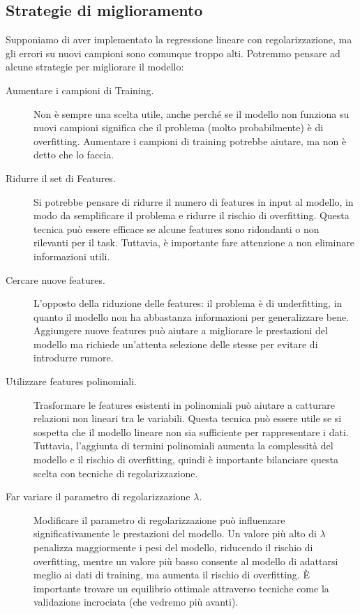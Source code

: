 \subsection{Strategie di miglioramento}
Supponiamo di aver implementato la regressione lineare con regolarizzazione, ma gli errori su nuovi campioni sono comunque troppo alti. Potremmo pensare ad alcune strategie per migliorare il modello:
\begin{description}
	\item[Aumentare i campioni di Training.] Non è sempre una scelta utile, anche perché se il modello non funziona su nuovi campioni significa che il problema (molto probabilmente) è di overfitting. Aumentare i campioni di training potrebbe aiutare, ma non è detto che lo faccia.
	\item[Ridurre il set di Features.] Si potrebbe pensare di ridurre il numero di features in input al modello, in modo da semplificare il problema e ridurre il rischio di overfitting. Questa tecnica può essere efficace se alcune features sono ridondanti o non rilevanti per il task. Tuttavia, è importante fare attenzione a non eliminare informazioni utili. 
	\item[Cercare nuove features.] L'opposto della riduzione delle features: il problema è di underfitting, in quanto il modello non ha abbastanza informazioni per generalizzare bene. Aggiungere nuove features può aiutare a migliorare le prestazioni del modello ma richiede un'attenta selezione delle stesse per evitare di introdurre rumore.
	\item[Utilizzare features polinomiali.] Trasformare le features esistenti in polinomiali può aiutare a catturare relazioni non lineari tra le variabili. Questa tecnica può essere utile se si sospetta che il modello lineare non sia sufficiente per rappresentare i dati. Tuttavia, l'aggiunta di termini polinomiali aumenta la complessità del modello e il rischio di overfitting, quindi è importante bilanciare questa scelta con tecniche di regolarizzazione.
	\item[Far variare il parametro di regolarizzazione $\lambda$.] Modificare il parametro di regolarizzazione può influenzare significativamente le prestazioni del modello. Un valore più alto di $\lambda$ penalizza maggiormente i pesi del modello, riducendo il rischio di overfitting, mentre un valore più basso consente al modello di adattarsi meglio ai dati di training, ma aumenta il rischio di overfitting. È importante trovare un equilibrio ottimale attraverso tecniche come la validazione incrociata (che vedremo più avanti). 
\end{description}

